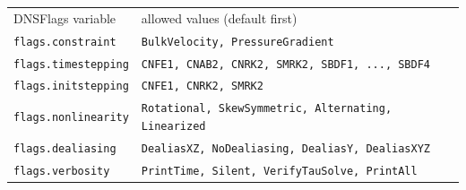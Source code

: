 \documentclass{article}[12pt]
\begin{document}
\begin{tabular}{ll}
DNSFlags variable  & allowed values (default first)\\
{\tt flags.constraint}   & {\tt BulkVelocity, PressureGradient}\\
{\tt flags.timestepping} & {\tt CNFE1, CNAB2, CNRK2, SMRK2, SBDF1, ..., SBDF4} \\
{\tt flags.initstepping} & {\tt CNFE1, CNRK2, SMRK2} \\
{\tt flags.nonlinearity} & {\tt Rotational, SkewSymmetric, Alternating, Linearized} \\
{\tt flags.dealiasing}   & {\tt DealiasXZ, NoDealiasing, DealiasY, DealiasXYZ} \\
{\tt flags.verbosity}    & {\tt PrintTime, Silent, VerifyTauSolve, PrintAll}
\end{tabular}
\vspace{2mm}
\end{document}
